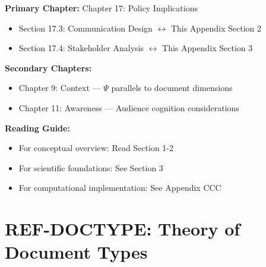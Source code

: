 \begin{tcolorbox}[colback=purple!5!white, colframe=purple!75!black,
    title=Chapter Linkage]

\textbf{Primary Chapter:} Chapter 17: Policy Implications
\begin{itemize}[nosep]
\item Section 17.3: Communication Design $\leftrightarrow$ This Appendix Section 2
\item Section 17.4: Stakeholder Analysis $\leftrightarrow$ This Appendix Section 3
\end{itemize}

\textbf{Secondary Chapters:}
\begin{itemize}[nosep]
\item Chapter 9: Context --- $\Psi$ parallels to document dimensions
\item Chapter 11: Awareness --- Audience cognition considerations
\end{itemize}

\textbf{Reading Guide:}
\begin{itemize}[nosep]
\item For conceptual overview: Read Section 1-2
\item For scientific foundations: See Section 3
\item For computational implementation: See Appendix CCC
\end{itemize}

\end{tcolorbox}

\chapter{REF-DOCTYPE: Theory of Document Types}
\label{app:doctype-theory}

\begin{abstract}
This appendix establishes the theoretical foundations for an 8-dimensional
framework of document types. Rather than treating document categories as
fixed taxonomies, we propose that document types emerge from the intersection
of audience characteristics and communication goals. Drawing on Halliday's
register theory, Swales' genre analysis, and List's critical thinking hierarchy,
we derive eight fundamental dimensions that characterize any document type.
This framework enables systematic document design and cross-cultural adaptation.
\end{abstract}

